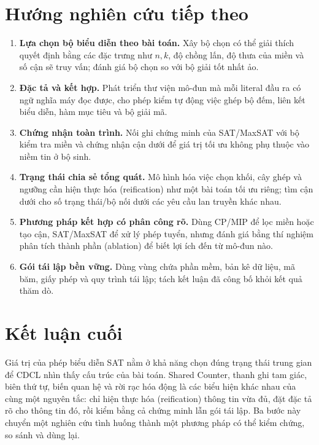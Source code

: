 \section{Hướng nghiên cứu tiếp theo}

\begin{enumerate}
  \item \textbf{Lựa chọn bộ biểu diễn theo bài toán.} Xây bộ chọn có thể giải thích
  quyết định bằng các đặc trưng như \(n,k\), độ chồng lấn, độ thưa của miền và
  số cận sẽ truy vấn; đánh giá bộ chọn so với bộ giải tốt nhất ảo.
  \item \textbf{Đặc tả và kết hợp.} Phát triển thư viện mô-đun mà mỗi literal
  đầu ra có ngữ nghĩa máy đọc được, cho phép kiểm tự động việc ghép bộ đếm,
  liên kết biểu diễn, hàm mục tiêu và bộ giải mã.
  \item \textbf{Chứng nhận toàn trình.} Nối ghi chứng minh của SAT/MaxSAT với
  bộ kiểm tra miền và chứng nhận cận dưới để giá trị tối ưu không phụ thuộc vào niềm tin ở
  bộ sinh.
  \item \textbf{Trạng thái chia sẻ tổng quát.} Mô hình hóa việc chọn khối,
  cây ghép và ngưỡng cần hiện thực hóa (reification) như một bài toán tối ưu riêng; tìm cận dưới
  cho số trạng thái/bộ nối dưới các yêu cầu lan truyền khác nhau.
  \item \textbf{Phương pháp kết hợp có phân công rõ.} Dùng CP/MIP để lọc miền
  hoặc tạo cận, SAT/MaxSAT để xử lý phép tuyển, nhưng đánh giá bằng thí nghiệm
  phân tích thành phần (ablation) để biết lợi ích đến từ mô-đun nào.
  \item \textbf{Gói tái lập bền vững.} Dùng vùng chứa phần mềm, bản kê dữ liệu,
  mã băm, giấy phép và quy trình tái lập; tách kết luận đã công bố khỏi kết quả
  thăm dò.
\end{enumerate}

\section{Kết luận cuối}

Giá trị của phép biểu diễn SAT nằm ở khả năng chọn đúng trạng thái trung gian để
CDCL nhìn thấy cấu trúc của bài toán. Shared Counter, thanh ghi tam giác,
biên thứ tự, biến quan hệ và rời rạc hóa động là các biểu hiện khác nhau của
cùng một nguyên tắc: chỉ hiện thực hóa (reification) thông tin vừa đủ, đặt đặc tả rõ cho thông tin
đó, rồi kiểm bằng cả chứng minh lẫn gói tái lập. Ba bước này chuyển một
nghiên cứu tình huống thành một phương pháp có thể kiểm chứng, so sánh và dùng
lại.
